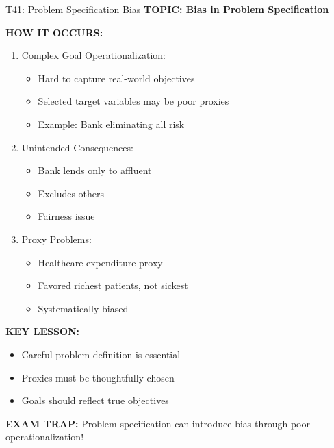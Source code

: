 \documentclass[8pt]{beamer}
\begin{document}
	\begin{frame}{T41: Problem Specification Bias}
		\fontsize{6.5}{7.5}\selectfont
		\textbf{TOPIC: Bias in Problem Specification}
		
		\vspace{0.1cm}
		\textbf{HOW IT OCCURS:}
		\begin{enumerate}
			\item \textcolor{myblue}{Complex Goal Operationalization:}
			\begin{itemize}
				\item Hard to capture real-world objectives
				\item Selected target variables may be poor proxies
				\item Example: Bank eliminating all risk
			\end{itemize}
			\item \textcolor{myblue}{Unintended Consequences:}
			\begin{itemize}
				\item Bank lends only to affluent
				\item Excludes others
				\item Fairness issue
			\end{itemize}
			\item \textcolor{myblue}{Proxy Problems:}
			\begin{itemize}
				\item Healthcare expenditure proxy
				\item Favored richest patients, not sickest
				\item Systematically biased
			\end{itemize}
		\end{enumerate}
		
		\vspace{0.1cm}
		\textbf{KEY LESSON:}
		\begin{itemize}
			\item Careful problem definition is essential
			\item Proxies must be thoughtfully chosen
			\item Goals should reflect true objectives
		\end{itemize}
		
		\textcolor{myred}{\textbf{EXAM TRAP:}} Problem specification can introduce \textcolor{myblue}{bias through poor operationalization}!
	\end{frame}
	
\end{document}
